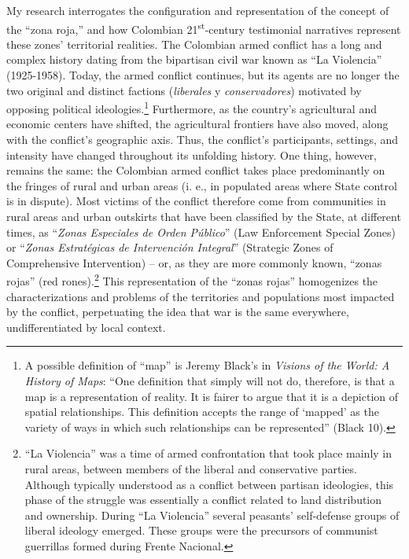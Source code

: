 \documentclass[
  11pt,
,
onecolumn,
openany
]{book}
\begin{document}
My research interrogates the configuration and representation of the concept
of the ``zona roja,'' and how Colombian 21\textsuperscript{st}-century
testimonial narratives represent these zones' territorial realities. The
Colombian armed conflict has a long and complex history dating from the
bipartisan civil war known as ``La Violencia'' (1925-1958). Today, the armed
conflict continues, but its agents are no longer the two original and distinct
factions (\emph{liberales} y \emph{conservadores}) motivated by opposing
political ideologies.\footnote{A possible definition of ``map'' is Jeremy
  Black's in \emph{Visions of the World: A History of Maps}: ``One definition
  that simply will not do, therefore, is that a map is a representation of
  reality. It is fairer to argue that it is a depiction of spatial
  relationships. This definition accepts the range of `mapped' as the variety
  of ways in which such relationships can be represented'' (Black 10).}
Furthermore, as the country's agricultural and economic centers have shifted,
the agricultural frontiers have also moved, along with the conflict's
geographic axis. Thus, the conflict's participants, settings, and intensity
have changed throughout its unfolding history. One thing, however, remains the
same: the Colombian armed conflict takes place predominantly on the fringes of
rural and urban areas (i. e., in populated areas where State control is in
dispute). Most victims of the conflict therefore come from communities in
rural areas and urban outskirts that have been classified by the State, at
different times, as ``\emph{Zonas Especiales de Orden Público}'' (Law
Enforcement Special Zones) or ``\emph{Zonas Estratégicas de Intervención
Integral}'' (Strategic Zones of Comprehensive Intervention) -- or, as they are
more commonly known, ``zonas rojas'' (red rones).\footnote{``La Violencia''
  was a time of armed confrontation that took place mainly in rural areas,
  between members of the liberal and conservative parties. Although typically
  understood as a conflict between partisan ideologies, this phase of the
  struggle was essentially a conflict related to land distribution and
  ownership. During ``La Violencia'' several peasants' self-defense groups of
  liberal ideology emerged. These groups were the precursors of communist
  guerrillas formed during Frente Nacional.} This representation of the
``zonas rojas'' homogenizes the characterizations and problems of the
territories and populations most impacted by the conflict, perpetuating the
idea that war is the same everywhere, undifferentiated by local context.
\end{document}
